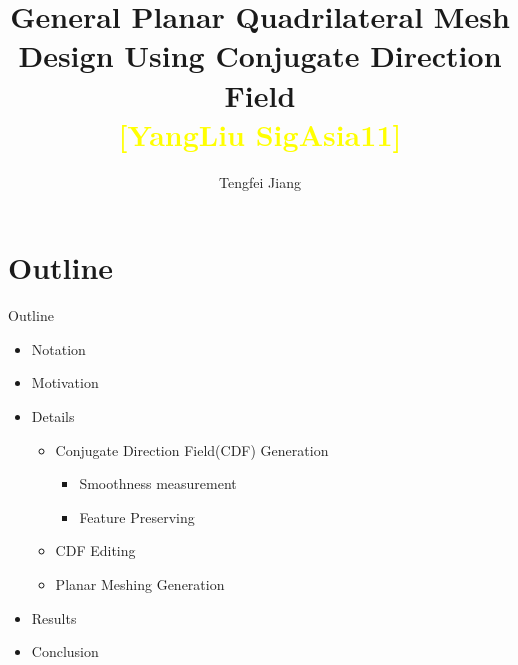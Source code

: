 \documentclass{beamer}
\begin{document}
\title{General Planar Quadrilateral Mesh Design Using Conjugate Direction Field \\ \textcolor{yellow}{[YangLiu SigAsia11]}}
\author{Tengfei Jiang}

\newcommand{\FPP}[2]{\frac{\partial #1}{\partial #2}}
\begin{frame}
  \titlepage
\end{frame}

\section{Outline}
\begin{frame}{Outline}
\begin{itemize}
  \item Notation
  \item Motivation
  \item Details
    \begin{itemize}
    \item Conjugate Direction Field(CDF) Generation
      \begin{itemize}
      \item Smoothness measurement
      \item Feature Preserving
      \end{itemize}
    \item CDF Editing
    \item Planar Meshing Generation
    \end{itemize}
  \item Results
  \item Conclusion
\end{itemize}
\end{frame}
\end{document}
